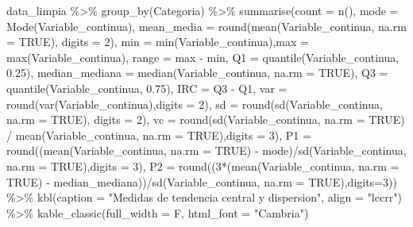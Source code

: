 \documentclass[
  letterpaper,
  DIV=11,
  numbers=noendperiod]{scrreprt}
\newenvironment{Shaded}{\begin{snugshade}}{\end{snugshade}}
\newcommand{\AttributeTok}[1]{\textcolor[rgb]{0.40,0.45,0.13}{#1}}
\newcommand{\ConstantTok}[1]{\textcolor[rgb]{0.56,0.35,0.01}{#1}}
\newcommand{\DecValTok}[1]{\textcolor[rgb]{0.68,0.00,0.00}{#1}}
\newcommand{\FloatTok}[1]{\textcolor[rgb]{0.68,0.00,0.00}{#1}}
\newcommand{\FunctionTok}[1]{\textcolor[rgb]{0.28,0.35,0.67}{#1}}
\newcommand{\NormalTok}[1]{\textcolor[rgb]{0.00,0.23,0.31}{#1}}
\newcommand{\SpecialCharTok}[1]{\textcolor[rgb]{0.37,0.37,0.37}{#1}}
\newcommand{\StringTok}[1]{\textcolor[rgb]{0.13,0.47,0.30}{#1}}
\begin{document}
\begin{Shaded}
\begin{Highlighting}[]
\NormalTok{data\_limpia }\SpecialCharTok{\%\textgreater{}\%} \FunctionTok{group\_by}\NormalTok{(Categoria) }\SpecialCharTok{\%\textgreater{}\%}
  \FunctionTok{summarise}\NormalTok{(}\AttributeTok{count =} \FunctionTok{n}\NormalTok{(),}
  \AttributeTok{mode =} \FunctionTok{Mode}\NormalTok{(Variable\_continua),}
  \AttributeTok{mean\_media =} \FunctionTok{round}\NormalTok{(}\FunctionTok{mean}\NormalTok{(Variable\_continua, }\AttributeTok{na.rm =} \ConstantTok{TRUE}\NormalTok{), }\AttributeTok{digits =} \DecValTok{2}\NormalTok{),}
  \AttributeTok{min =}  \FunctionTok{min}\NormalTok{(Variable\_continua),}\AttributeTok{max =} \FunctionTok{max}\NormalTok{(Variable\_continua),}
  \AttributeTok{range =}\NormalTok{ max }\SpecialCharTok{{-}}\NormalTok{ min, }
  \AttributeTok{Q1 =} \FunctionTok{quantile}\NormalTok{(Variable\_continua, }\FloatTok{0.25}\NormalTok{),}
  \AttributeTok{median\_mediana =} \FunctionTok{median}\NormalTok{(Variable\_continua, }\AttributeTok{na.rm =} \ConstantTok{TRUE}\NormalTok{),}
  \AttributeTok{Q3 =} \FunctionTok{quantile}\NormalTok{(Variable\_continua, }\FloatTok{0.75}\NormalTok{),}
  \AttributeTok{IRC =}\NormalTok{ Q3 }\SpecialCharTok{{-}}\NormalTok{ Q1,}
  \AttributeTok{var =} \FunctionTok{round}\NormalTok{(}\FunctionTok{var}\NormalTok{(Variable\_continua),}\AttributeTok{digits =} \DecValTok{2}\NormalTok{),}
  \AttributeTok{sd =} \FunctionTok{round}\NormalTok{(}\FunctionTok{sd}\NormalTok{(Variable\_continua, }\AttributeTok{na.rm =} \ConstantTok{TRUE}\NormalTok{), }\AttributeTok{digits =} \DecValTok{2}\NormalTok{),}
  \AttributeTok{vc =} \FunctionTok{round}\NormalTok{(}\FunctionTok{sd}\NormalTok{(Variable\_continua, }\AttributeTok{na.rm =} \ConstantTok{TRUE}\NormalTok{) }\SpecialCharTok{/} \FunctionTok{mean}\NormalTok{(Variable\_continua, }\AttributeTok{na.rm =} \ConstantTok{TRUE}\NormalTok{),}\AttributeTok{digits =} \DecValTok{3}\NormalTok{),}
  \AttributeTok{P1 =} \FunctionTok{round}\NormalTok{((}\FunctionTok{mean}\NormalTok{(Variable\_continua, }\AttributeTok{na.rm =} \ConstantTok{TRUE}\NormalTok{) }\SpecialCharTok{{-}}\NormalTok{ mode)}\SpecialCharTok{/}\FunctionTok{sd}\NormalTok{(Variable\_continua, }\AttributeTok{na.rm =} \ConstantTok{TRUE}\NormalTok{),}\AttributeTok{digits =} \DecValTok{3}\NormalTok{),}
  \AttributeTok{P2 =} \FunctionTok{round}\NormalTok{((}\DecValTok{3}\SpecialCharTok{*}\NormalTok{(}\FunctionTok{mean}\NormalTok{(Variable\_continua, }\AttributeTok{na.rm =} \ConstantTok{TRUE}\NormalTok{) }\SpecialCharTok{{-}}\NormalTok{ median\_mediana))}\SpecialCharTok{/}\FunctionTok{sd}\NormalTok{(Variable\_continua, }\AttributeTok{na.rm =} \ConstantTok{TRUE}\NormalTok{),}\AttributeTok{digits=}\DecValTok{3}\NormalTok{)) }\SpecialCharTok{\%\textgreater{}\%} 
  \FunctionTok{kbl}\NormalTok{(}\AttributeTok{caption =} \StringTok{"Medidas de tendencia central y dispersion"}\NormalTok{,}
      \AttributeTok{align =} \StringTok{"lccrr"}\NormalTok{) }\SpecialCharTok{\%\textgreater{}\%} 
  \FunctionTok{kable\_classic}\NormalTok{(}\AttributeTok{full\_width =}\NormalTok{ F, }\AttributeTok{html\_font =} \StringTok{"Cambria"}\NormalTok{)}
\end{Highlighting}
\end{Shaded}
\end{document}
